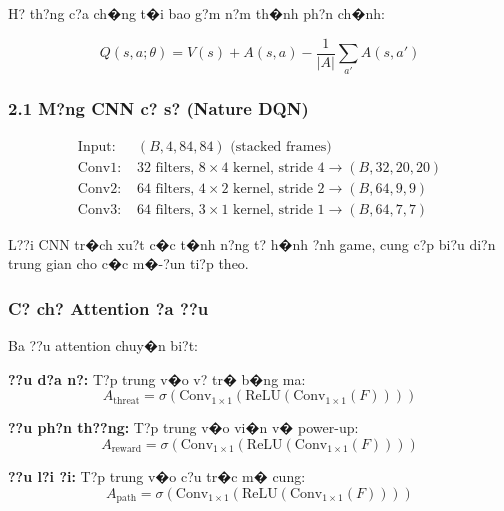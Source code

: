 \documentclass[11pt,a4paper]{article}
\begin{document}
H? th?ng c?a ch�ng t�i bao g?m n?m th�nh ph?n ch�nh:

\begin{equation}
Q(s,a; \theta) = V(s) + A(s,a) - \frac{1}{|A|}\sum_{a'} A(s,a')
\end{equation}

\subsubsection{2.1 M?ng CNN c? s? (Nature DQN)}

\begin{equation}
\begin{split}
\text{Input: } &(B, 4, 84, 84) \text{ (stacked frames)} \\
\text{Conv1: } &32 \text{ filters, } 8\times4 \text{ kernel, stride 4} \rightarrow (B, 32, 20, 20) \\
\text{Conv2: } &64 \text{ filters, } 4\times2 \text{ kernel, stride 2} \rightarrow (B, 64, 9, 9) \\
\text{Conv3: } &64 \text{ filters, } 3\times1 \text{ kernel, stride 1} \rightarrow (B, 64, 7, 7)
\end{split}
\end{equation}

L??i CNN tr�ch xu?t c�c t�nh n?ng t? h�nh ?nh game, cung c?p bi?u di?n trung gian cho c�c m�-?un ti?p theo.

\subsubsection{C? ch? Attention ?a ??u}

Ba ??u attention chuy�n bi?t:

\textbf{??u d?a n?:} T?p trung v�o v? tr� b�ng ma:
\begin{equation}
A_{\text{threat}} = \sigma(\text{Conv}_{1\times1}(\text{ReLU}(\text{Conv}_{1\times1}(F))))
\end{equation}

\textbf{??u ph?n th??ng:} T?p trung v�o vi�n v� power-up:
\begin{equation}
A_{\text{reward}} = \sigma(\text{Conv}_{1\times1}(\text{ReLU}(\text{Conv}_{1\times1}(F))))
\end{equation}

\textbf{??u l?i ?i:} T?p trung v�o c?u tr�c m� cung:
\begin{equation}
A_{\text{path}} = \sigma(\text{Conv}_{1\times1}(\text{ReLU}(\text{Conv}_{1\times1}(F))))
\end{equation}
\end{document}

